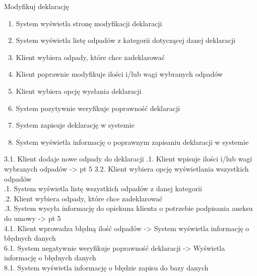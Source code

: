	\begin{usecase}{Modyfikuj deklarację}
		\author{Beata Obrok}
		\maketitle
		\begin{scenario}
			\begin{enumerate}
				\item System wyświetla stronę modyfikacji deklaracji
				\item System wyświetla listę odpadów z kategorii dotyczącej danej deklaracji
				\item Klient wybiera odpady, które chce zadeklarować
				\item Klient poprawnie modyfikuje ilości i/lub wagi wybranych odpadów
				\item Klient wybiera opcję wysłania deklaracji
				\item System pozytywnie weryfikuje poprawność deklaracji
				\item System zapisuje deklarację w systemie
				\item System wyświetla informację o poprawnym zapisaniu deklaracji w systemie
			\end{enumerate}
		\end{scenario}
				3.1. Klient dodaje nowe odpady do deklaracji
					.1. Klient wpisuje ilości i/lub wagi wybranych odpadów -> pt 5
				3.2. Klient wybiera opcję wyświetlania wszystkich odpadów \\
					.1. System wyświetla listę wszystkich odpadów z danej kategorii \\
					.2. Klient wybiera odpady, które chce zadeklarować \\
					.3. System wysyła informację do opiekuna klienta o potrzebie podpisania aneksu do umowy -> pt 5 \\
				4.1. Klient wprowadza błędną ilość odpadów -> System wyświetla informację o błędnych danych \\
				6.1. System negatywnie weryfikuje poprawność deklaracji -> Wyświetla informację o błędnych danych \\
				8.1. System wyświetla informację o błędzie zapisu do bazy danych \\
\end{usecase}

